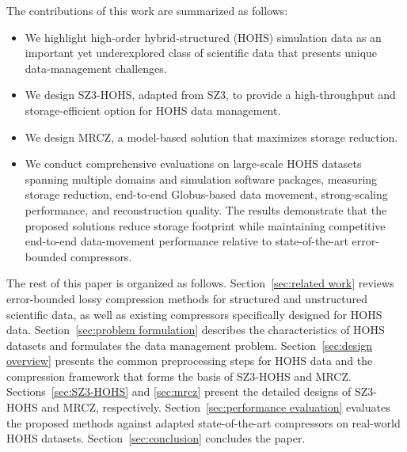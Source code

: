 The contributions of this work are summarized as follows:
\begin{itemize}
\item We highlight high-order hybrid-structured (HOHS) simulation data as an important yet underexplored class of scientific data that presents unique data-management challenges.
\item We design SZ3-HOHS, adapted from SZ3, to provide a high-throughput and storage-efficient option for HOHS data management.
\item We design MRCZ, a model-based solution that maximizes storage reduction.
\item We conduct comprehensive evaluations on large-scale HOHS datasets spanning multiple domains and simulation software packages, measuring storage reduction, end-to-end Globus-based data movement, strong-scaling performance, and reconstruction quality. The results demonstrate that the proposed solutions reduce storage footprint while maintaining competitive end-to-end data-movement performance relative to state-of-the-art error-bounded compressors.
\end{itemize}

The rest of this paper is organized as follows. Section~\ref{sec:related work} reviews error-bounded lossy compression methods for structured and unstructured scientific data, as well as existing compressors specifically designed for HOHS data. Section~\ref{sec:problem formulation} describes the characteristics of HOHS datasets and formulates the data management problem. Section~\ref{sec:design overview} presents the common preprocessing steps for HOHS data and the compression framework that forms the basis of SZ3-HOHS and MRCZ. Sections~\ref{sec:SZ3-HOHS} and \ref{sec:mrcz} present the detailed designs of SZ3-HOHS and MRCZ, respectively. Section~\ref{sec:performance evaluation} evaluates the proposed methods against adapted state-of-the-art compressors on real-world HOHS datasets. Section~\ref{sec:conclusion} concludes the paper.